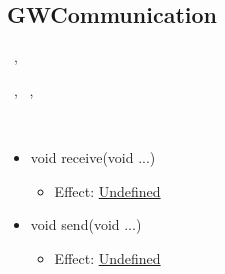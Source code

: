   \subsection{GWCommunication}\label{int:OnlineServiceOnlineServiceGatewayBrokerGWBrokerLogicGWCommunication}
    \begin{description}
      \item[Provided by:] \iconcomponent{}~, \iconcomponent{}~
      \item[Required by:] \iconcomponent{}~, \iconcomponent{}~, \iconcomponent{}~
      \item[Operations:] ~
    \begin{itemize}[noitemsep,nolistsep,leftmargin=-.25cm]
      \item \textsf{void receive(void ...)}
        \begin{itemize}[noitemsep,nolistsep]
           \item Effect: {\colorbox{red!30}{\underline{Undefined}}}
        \end{itemize}
      \item \textsf{void send(void ...)}
        \begin{itemize}[noitemsep,nolistsep]
           \item Effect: {\colorbox{red!30}{\underline{Undefined}}}
        \end{itemize}
    \end{itemize}
    \end{description}

